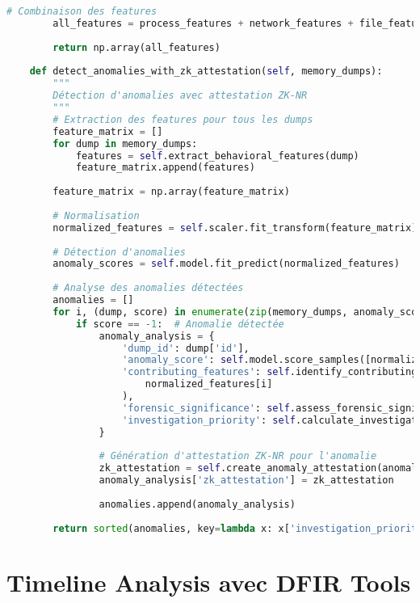 \begin{lstlisting}[language=Python, caption=Détecteur d'anomalies comportementales avec IA]
        # Combinaison des features
        all_features = process_features + network_features + file_features
        
        return np.array(all_features)
    
    def detect_anomalies_with_zk_attestation(self, memory_dumps):
        """
        Détection d'anomalies avec attestation ZK-NR
        """
        # Extraction des features pour tous les dumps
        feature_matrix = []
        for dump in memory_dumps:
            features = self.extract_behavioral_features(dump)
            feature_matrix.append(features)
            
        feature_matrix = np.array(feature_matrix)
        
        # Normalisation
        normalized_features = self.scaler.fit_transform(feature_matrix)
        
        # Détection d'anomalies
        anomaly_scores = self.model.fit_predict(normalized_features)
        
        # Analyse des anomalies détectées
        anomalies = []
        for i, (dump, score) in enumerate(zip(memory_dumps, anomaly_scores)):
            if score == -1:  # Anomalie détectée
                anomaly_analysis = {
                    'dump_id': dump['id'],
                    'anomaly_score': self.model.score_samples([normalized_features[i]])[0],
                    'contributing_features': self.identify_contributing_features(
                        normalized_features[i]
                    ),
                    'forensic_significance': self.assess_forensic_significance(dump),
                    'investigation_priority': self.calculate_investigation_priority(dump)
                }
                
                # Génération d'attestation ZK-NR pour l'anomalie
                zk_attestation = self.create_anomaly_attestation(anomaly_analysis)
                anomaly_analysis['zk_attestation'] = zk_attestation
                
                anomalies.append(anomaly_analysis)
                
        return sorted(anomalies, key=lambda x: x['investigation_priority'], reverse=True)
\end{lstlisting}

\section{Timeline Analysis avec DFIR Tools}

